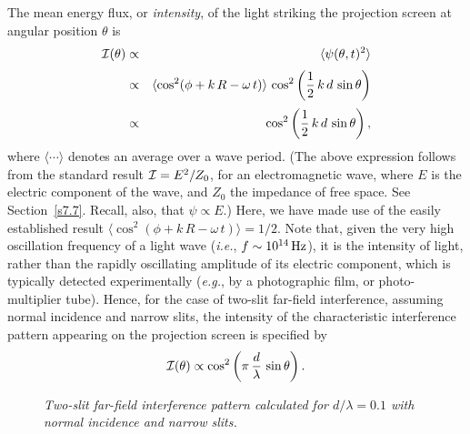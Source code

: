 The mean energy flux, or {\em intensity}, of the light striking the projection screen at angular position $\theta$
is 
\begin{eqnarray}
{\cal I}(\theta) &\propto& \langle \psi(\theta,t)^2\rangle\nonumber\\[0.5ex]
&\propto& \langle \cos^2(\phi+k\,R-\omega\,t)\rangle\,\cos^2\left(\frac{1}{2}\,k\,d\,\sin\theta\right)\nonumber\\[0.5ex]
&\propto&\cos^2\left(\frac{1}{2}\,k\,d\,\sin\theta\right),
\end{eqnarray}
where $\langle\cdots\rangle$ denotes an average over a wave period. (The above expression follows from the standard result ${\cal I} = E^2/Z_0$, for
an electromagnetic wave, where $E$ is the electric component of the wave, and $Z_0$ the impedance of free space. See Section~\ref{s7.7}. Recall, also, that $\psi\propto E$.)  Here, we have made use of the easily established result $\langle\cos^2(\phi+k\,R-\omega\,t)\rangle=1/2$.
Note that, given the very high
oscillation frequency of a light wave ({\em i.e.}, $f\sim 10^{14}\,{\rm Hz}$), it is the intensity of  light, rather than the rapidly
oscillating amplitude of its electric component, which is typically detected experimentally ({\em e.g.}, by
a photographic film, or photo-multiplier tube). Hence, for the case of  two-slit far-field interference,  assuming normal incidence and
narrow slits, the intensity of the characteristic interference pattern appearing
on the projection screen is specified  by
\begin{equation}\label{e11.11}
{\cal I}(\theta) \propto \cos^2\left(\pi\,\frac{d}{\lambda}\,\sin\theta\right).
\end{equation}

\begin{figure}
\epsfysize=2.5in
\centerline{}
\caption{\em Two-slit far-field interference pattern calculated for $d/\lambda = 0.1$ with normal incidence and narrow slits.}\label{f11.4}   
\end{figure}

